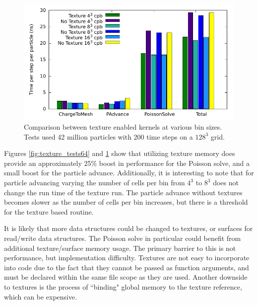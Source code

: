 \begin{figure}
\begin{center}
\includegraphics[width=6in]{performance/texture_tests128.pdf}
\end{center}
\caption[Comparison between texture enabled kernels on a $128^3$ grid]{Comparison between texture enabled kernels at various bin sizes. Tests used 42 million particles with 200 time steps on a $128^3$ grid.}
\label{fig:texture_tests128}
\end{figure}

Figures \ref{fig:texture_tests64} and \ref{fig:texture_tests128} show that utilizing texture memory does provide an approximately 25\% boost in performance for the Poisson solve, and a small boost for the particle advance. Additionally, it is interesting to note that for particle advancing varying the number of cells per bin from $4^3$ to $8^3$ does not change the run time of the texture run. The particle advance without textures becomes slower as the number of cells per bin increases, but there is a threshold for the texture based routine.

It is likely that more data structures could be changed to textures, or surfaces for read/write data structures. The Poisson solve in particular could benefit from additional texture/surface memory usage. The primary barrier to this is not performance, but implementation difficulty. Textures are not easy to incorporate into code due to the fact that they cannot be passed as function arguments, and must be declared within the same file scope as they are used. Another downside to textures is the process of ``binding" global memory to the texture reference, which can be expensive.  





